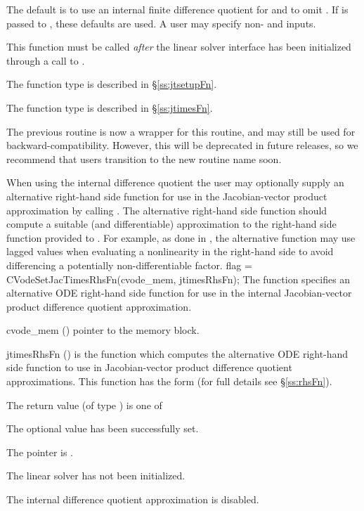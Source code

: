 {
  The default is to use an internal finite difference quotient for
   and to omit .  If  is passed to
  , these defaults are used.  A user may specify
  non-  and   inputs.

  This function must be called \emph{after} the {\cvls} linear solver
  interface has been initialized through a call to
  .

  The function type  is described in \S\ref{ss:jtsetupFn}.

  The function type  is described in \S\ref{ss:jtimesFn}.

  The previous routine  is now a wrapper for
  this routine, and may still be used for backward-compatibility.
  However, this will be deprecated in future releases, so we recommend
  that users transition to the new routine name soon.
}
When using the internal difference quotient the user may optionally supply an
alternative right-hand side function for use in the Jacobian-vector product
approximation by calling . The alternative right-hand
side function should compute a suitable (and differentiable) approximation to
the right-hand side function provided to . For example, as done in
\cite{dorr2010numerical}, the alternative function may use lagged values when
evaluating a nonlinearity in the right-hand side to avoid differencing a
potentially non-differentiable factor.
{
  flag = CVodeSetJacTimesRhsFn(cvode\_mem, jtimesRhsFn);
}
{
  The function  specifies an alternative ODE
  right-hand side function for use in the internal Jacobian-vector product
  difference quotient approximation.
}
{
  \begin{args}[jtimesRhsFn]
  \item[cvode\_mem] ()
    pointer to the {\cvodes} memory block.
  \item[jtimesRhsFn] ()
    is the {\CC} function which computes the alternative ODE right-hand side
    function to use in Jacobian-vector product difference quotient
    approximations. This function has the form 
    (for full details see \S\ref{ss:rhsFn}).
  \end{args}
}
{
  The return value  (of type ) is one of
  \begin{args}
  \item[\Id{CVLS\_SUCCESS}]
    The optional value has been successfully set.
  \item[\Id{CVLS\_MEM\_NULL}]
    The  pointer is .
  \item[\Id{CVLS\_LMEM\_NULL}]
    The {\cvls} linear solver has not been initialized.
  \item[\Id{CVLS\_ILL\_INPUT}]
    The internal difference quotient approximation is disabled.
  \end{args}
}
